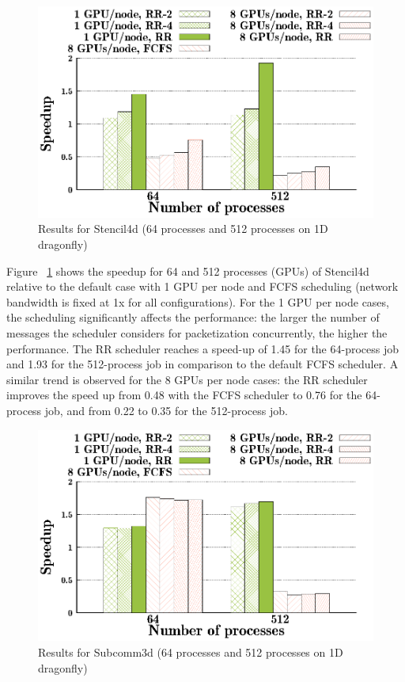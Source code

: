 \begin{figure}[!htbp]
  \centering
  \includegraphics[width=0.8\columnwidth]{figure/plots/sched/dfly-sched-mapping-stencil.eps}
  \vspace{-0.5in}
  \caption{Results for Stencil4d (64 processes and 512 processes on 1D dragonfly)}
  \label{fig:stencil_scheduling_dfly}
\end{figure}


Figure ~\ref{fig:stencil_scheduling_dfly} shows the speedup for 64 and 512
processes (GPUs) of Stencil4d relative to the default case with 1 GPU per node and
FCFS scheduling (network bandwidth is fixed at 1x for all configurations).  For
the 1 GPU per node cases, the scheduling significantly affects the performance:
the larger the number of messages the scheduler considers for packetization
concurrently, the higher the performance. The RR scheduler reaches a speed-up of
1.45 for the 64-process job and 1.93 for the 512-process job in comparison to
the default FCFS scheduler. A similar trend is observed for the 8 GPUs per node
cases: the RR scheduler improves the speed up from 0.48 with the FCFS scheduler to 0.76
for the 64-process job, and from 0.22 to 0.35 for the 512-process job. 

\begin{figure}[!htbp]
\centering
  \includegraphics[width=0.8\columnwidth]{figure/plots/sched/dfly-sched-mapping-subcom.eps}
  \vspace{-0.5in}
  \caption{Results for Subcomm3d (64 processes and 512 processes on 1D dragonfly)}
  \label{fig:subcomm3d_scheduling_dfly}
\end{figure}


